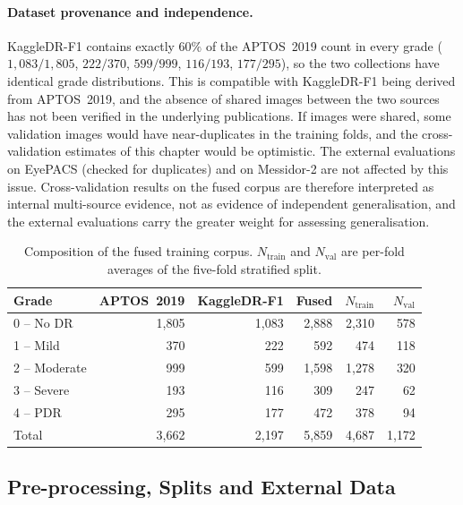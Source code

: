 \paragraph{Dataset provenance and independence.}
KaggleDR-F1 contains exactly $60\%$ of the APTOS~2019 count in every grade
($1{,}083/1{,}805$, $222/370$, $599/999$, $116/193$, $177/295$), so the two collections have
identical grade distributions. This is compatible with KaggleDR-F1 being derived from
APTOS~2019, and the absence of shared images between the two sources has not been verified
in the underlying publications. If images were shared, some validation images would have
near-duplicates in the training folds, and the cross-validation estimates of this chapter
would be optimistic. The external evaluations on EyePACS (checked for duplicates) and on
Messidor-2 are not affected by this issue. Cross-validation results on the fused corpus
are therefore interpreted as internal multi-source evidence, not as evidence of
independent generalisation, and the external evaluations carry the greater weight for
assessing generalisation.

\begin{table}[!htbp]
\centering
\caption[Composition of the fused training corpus]{Composition of the fused training
corpus. $N_{\mathrm{train}}$ and $N_{\mathrm{val}}$ are per-fold averages of the five-fold
stratified split.}
\label{tab:corpus}
\small
\begin{tabular}{@{}lrrrrr@{}}
\toprule
Grade & APTOS~2019 & KaggleDR-F1 & Fused & $N_{\mathrm{train}}$ & $N_{\mathrm{val}}$ \\
\midrule
0 -- No DR & 1{,}805 & 1{,}083 & 2{,}888 & 2{,}310 & 578 \\
1 -- Mild & 370 & 222 & 592 & 474 & 118 \\
2 -- Moderate & 999 & 599 & 1{,}598 & 1{,}278 & 320 \\
3 -- Severe & 193 & 116 & 309 & 247 & 62 \\
4 -- PDR & 295 & 177 & 472 & 378 & 94 \\
\midrule
Total & 3{,}662 & 2{,}197 & 5{,}859 & 4{,}687 & 1{,}172 \\
\bottomrule
\end{tabular}
\end{table}

\subsection{Pre-processing, Splits and External Data}


